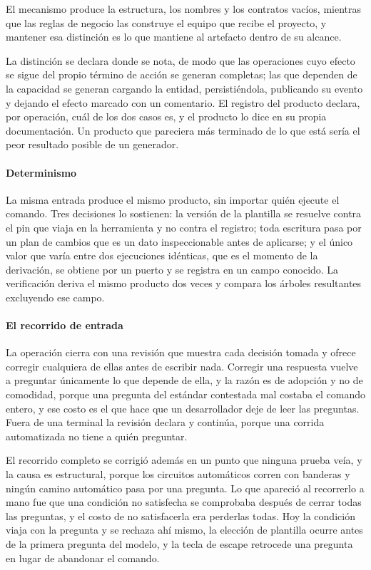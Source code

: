 El mecanismo produce la estructura, los nombres y los contratos vacíos,
mientras que las reglas de negocio las construye el equipo que recibe el
proyecto, y mantener esa distinción es lo que mantiene al artefacto dentro de
su alcance.

La distinción se declara donde se nota, de modo que las operaciones cuyo
efecto se sigue del propio término de acción se generan completas; las que
dependen de la capacidad se generan cargando la entidad, persistiéndola,
publicando su evento y dejando el efecto marcado con un comentario. El
registro del producto declara, por operación, cuál de los dos casos es, y el
producto lo dice en su propia documentación. Un producto que pareciera más
terminado de lo que está sería el peor resultado posible de un generador.

\paragraph*{Determinismo}

La misma entrada produce el mismo producto, sin importar quién ejecute el
comando. Tres decisiones lo sostienen: la versión de la plantilla se resuelve
contra el pin que viaja en la herramienta y no contra el registro; toda
escritura pasa por un plan de cambios que es un dato inspeccionable antes de
aplicarse; y el único valor que varía entre dos ejecuciones idénticas, que es
el momento de la derivación, se obtiene por un puerto y se registra en un
campo conocido. La verificación deriva el mismo producto dos veces y compara
los árboles resultantes excluyendo ese campo.

\paragraph*{El recorrido de entrada}

La operación cierra con una revisión que muestra cada decisión tomada y
ofrece corregir cualquiera de ellas antes de escribir nada. Corregir una
respuesta vuelve a preguntar únicamente lo que depende de ella, y la razón es de
adopción y no de comodidad, porque una pregunta del estándar contestada mal
costaba el comando entero, y ese costo es el que hace que un desarrollador
deje de leer las preguntas. Fuera de una terminal la revisión declara y
continúa, porque una corrida automatizada no tiene a quién preguntar.

El recorrido completo se corrigió además en un punto que ninguna prueba veía,
y la causa es estructural, porque los circuitos automáticos corren con
banderas y ningún camino automático pasa por una pregunta. Lo que apareció al
recorrerlo a mano fue que una condición no satisfecha se comprobaba después
de cerrar todas las preguntas, y el costo de no satisfacerla era perderlas
todas. Hoy la condición viaja con la pregunta y se rechaza ahí mismo, la
elección de plantilla ocurre antes de la primera pregunta del modelo, y la
tecla de escape retrocede una pregunta en lugar de abandonar el comando.


